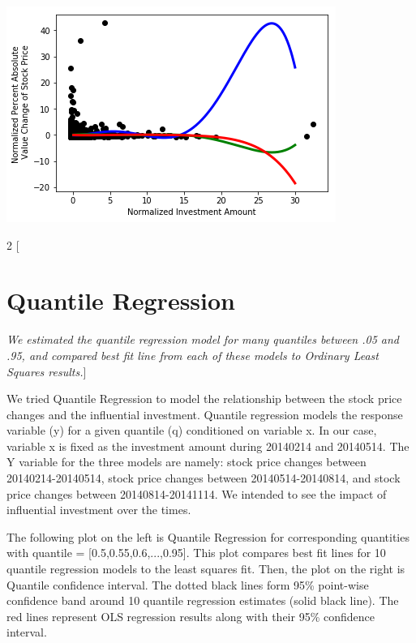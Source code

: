 \documentclass{article}
\begin{document}
\includegraphics[scale = 0.6]{polyoverfit.png}

\begin{multicols}{2}
[\section*{Quantile Regression}\textit{We estimated the quantile regression model for many quantiles between .05 and .95, and compared best fit line from each of these models to Ordinary Least Squares results.}]

We tried Quantile Regression to model the relationship between the stock price changes and the influential investment. Quantile regression models the response variable (y) for a given quantile (q) conditioned on variable x. In our case, variable x is fixed as the investment amount during 20140214 and 20140514. The Y variable for the three models are namely:  stock price changes between 20140214-20140514, stock price changes between 20140514-20140814, and stock price changes between 20140814-20141114. We intended to see the impact of influential investment over the times.

The following plot on the left is Quantile Regression for corresponding quantities with quantile = [0.5,0.55,0.6,...,0.95]. This plot compares best fit lines for 10 quantile regression models to the least squares fit. Then, the plot on the right is Quantile confidence interval. The dotted black lines form 95\% point-wise confidence band around 10 quantile regression estimates (solid black line). The red lines represent OLS regression results along with their 95\% confidence interval.\\


\end{multicols}
\end{document}
